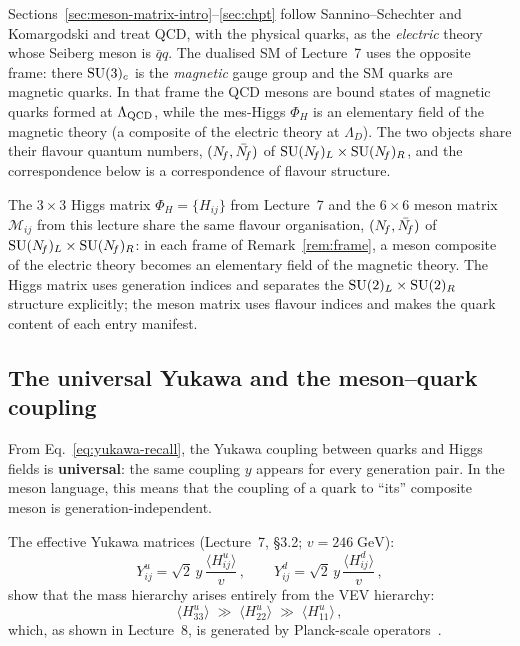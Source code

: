 \documentclass[11pt,a4paper]{article}
\begin{document}
\begin{remark}
\label{rem:frame}
Sections~\ref{sec:meson-matrix-intro}--\ref{sec:chpt} follow
Sannino--Schechter and Komargodski and treat QCD, with the physical
quarks, as the \emph{electric} theory whose Seiberg meson is
$\bar{q}q$.  The dualised SM of Lecture~7 uses the opposite frame:
there $\mathrm{SU}(3)_c$ is the \emph{magnetic} gauge group and the SM quarks
are magnetic quarks.  In that frame the QCD mesons are bound states of
magnetic quarks formed at $\Lambda_{\mathrm{QCD}}$, while the mes-Higgs
$\Phi_H$ is an elementary field of the magnetic theory (a composite of
the electric theory at $\Lambda_D$).  The two objects share their
flavour quantum numbers, $(N_{\!f}, \bar{N_{\!f}})$ of
$\mathrm{SU}(N_{\!f})_L \times \mathrm{SU}(N_{\!f})_R$, and the correspondence below is a
correspondence of flavour structure.
\end{remark}

\begin{remark}
\label{rem:higgs-meson}
The $3 \times 3$ Higgs matrix $\Phi_H = \{H_{ij}\}$ from Lecture~7
and the $6 \times 6$ meson matrix $\mathcal{M}_{ij}$ from this lecture
share the same flavour organisation, $(N_{\!f}, \bar{N_{\!f}})$ of
$\mathrm{SU}(N_{\!f})_L \times \mathrm{SU}(N_{\!f})_R$: in each frame of
Remark~\ref{rem:frame}, a meson composite of the electric theory
becomes an elementary field of the magnetic theory.  The Higgs matrix uses generation indices
and separates the $\mathrm{SU}(2)_L \times \mathrm{SU}(2)_R$ structure explicitly;
the meson matrix uses flavour indices and makes the quark content of
each entry manifest.
\end{remark}


\subsection{The universal Yukawa and the meson--quark coupling}

From Eq.~\eqref{eq:yukawa-recall}, the Yukawa coupling between quarks
and Higgs fields is \textbf{universal}: the same coupling $y$ appears
for every generation pair.  In the meson language, this means that the
coupling of a quark to ``its'' composite meson is generation-independent.

The effective Yukawa matrices (Lecture~7, \S3.2; $v = 246\;\text{GeV}$):
\begin{equation}\label{eq:eff-yukawa-recall}
  Y_{ij}^{u} = \sqrt{2}\, y\,\frac{\langle H_{ij}^u \rangle}{v}\,,
  \qquad
  Y_{ij}^{d} = \sqrt{2}\, y\,\frac{\langle H_{ij}^d \rangle}{v}\,,
\end{equation}
show that the mass hierarchy arises entirely from the VEV hierarchy:
\begin{equation}\label{eq:vev-hierarchy}
  \langle H_{33}^u \rangle \;\gg\; \langle H_{22}^u \rangle
  \;\gg\; \langle H_{11}^u \rangle\,,
\end{equation}
which, as shown in Lecture~8, is generated by Planck-scale
operators~\cite{CacciapagliaSannino2024}.
\end{document}
